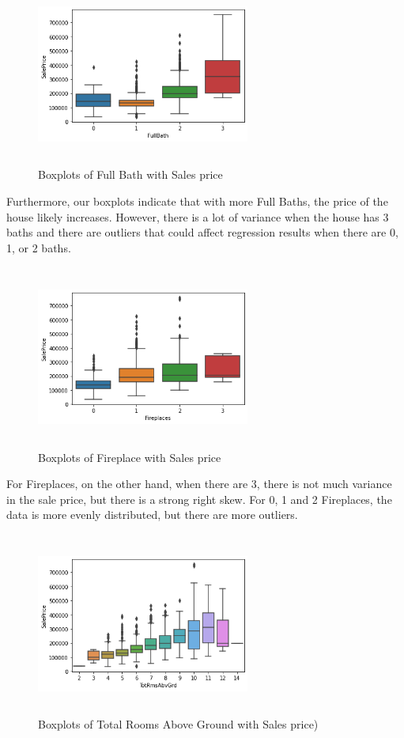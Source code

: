 \documentclass[fleqn,10pt]{SelfArx} %
\begin{document}
\begin{figure}[H]
    \centering
    \includegraphics[width=7cm, height=6cm]{img/fullbathboxplot.png}
    \caption{Boxplots of Full Bath with Sales price}
    \label{fig:my_label}
\end{figure}
Furthermore, our boxplots indicate that with more Full Baths, the price of the house likely increases. However, there is a lot of variance when the house has 3 baths and there are outliers that could affect regression results when there are 0, 1, or 2 baths. 
\begin{figure}[H]
    \centering
    \includegraphics[width=7cm, height=6cm]{img/fireplacesboxplot.png}
    \caption{Boxplots of Fireplace with Sales price}
    \label{fig:my_label}
\end{figure}
For Fireplaces, on the other hand, when there are 3, there is not much variance in the sale price, but there is a strong right skew. For 0, 1 and 2 Fireplaces, the data is more evenly distributed, but there are more outliers. 
\begin{figure}[H]
    \centering
    \includegraphics[width=7cm, height=6cm]{img/totrmsabvgrdboxplot.png}
    \caption{Boxplots of Total Rooms Above Ground with Sales price)}
    \label{fig:my_label}
\end{figure}
\end{document}

